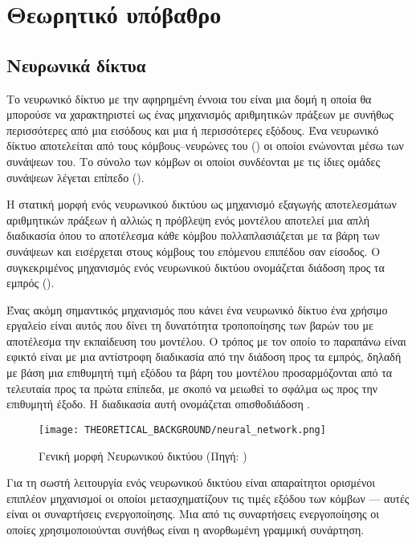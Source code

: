 \chapter{Θεωρητικό υπόβαθρο}
\label{ch:theoreteical_background}

\section{Νευρωνικά δίκτυα}
Το νευρωνικό δίκτυο με την αφηρημένη έννοια του είναι μια δομή η οποία θα μπορούσε να χαρακτηριστεί ως ένας μηχανισμός αριθμητικών πράξεων με συνήθως περισσότερες από μια εισόδους και μια ή περισσότερες εξόδους. Ένα νευρωνικό δίκτυο αποτελείται από τους κόμβους--νευρώνες του () οι οποίοι ενώνονται μέσω των συνάψεων του. Το σύνολο των κόμβων οι οποίοι συνδέονται με τις ίδιες ομάδες συνάψεων λέγεται επίπεδο ().

Η στατική μορφή ενός νευρωνικού δικτύου ως μηχανισμό εξαγωγής αποτελεσμάτων αριθμητικών πράξεων ή αλλιώς η πρόβλεψη ενός μοντέλου αποτελεί μια απλή διαδικασία όπου το αποτέλεσμα κάθε κόμβου πολλαπλασιάζεται με τα βάρη των συνάψεων και εισέρχεται στους κόμβους του επόμενου επιπέδου σαν είσοδος. Ο συγκεκριμένος μηχανισμός ενός νευρωνικού δικτύου ονομάζεται διάδοση προς τα εμπρός ().

Ένας ακόμη σημαντικός μηχανισμός που κάνει ένα νευρωνικό δίκτυο ένα χρήσιμο εργαλείο είναι αυτός που δίνει τη δυνατότητα τροποποίησης των βαρών του με αποτέλεσμα την εκπαίδευση του μοντέλου. Ο τρόπος με τον οποίο το παραπάνω είναι εφικτό είναι με μια αντίστροφη διαδικασία από την διάδοση προς τα εμπρός, δηλαδή με βάση μια επιθυμητή τιμή εξόδου τα βάρη του μοντέλου προσαρμόζονται από τα τελευταία προς τα πρώτα επίπεδα, με σκοπό να μειωθεί το σφάλμα ως προς την επιθυμητή έξοδο. Η διαδικασία αυτή ονομάζεται οπισθοδιάδοση .

\begin{figure}[H]
  \begin{center}
    \texttt{[image: THEORETICAL\_BACKGROUND/neural\_network.png]}
    \caption{Γενική μορφή Νευρωνικού δικτύου (Πηγή: \href{https://mc.ai/my-notes-on-neural-networks-2/}{})}
    \label{fig:neur_net}
  \end{center}
\end{figure}

Για τη σωστή λειτουργία ενός νευρωνικού δικτύου είναι απαραίτητοι ορισμένοι επιπλέον μηχανισμοί οι οποίοι μετασχηματίζουν τις τιμές εξόδου των κόμβων --- αυτές είναι οι συναρτήσεις ενεργοποίησης. Μια από τις συναρτήσεις ενεργοποίησης οι οποίες χρησιμοποιούνται συνήθως είναι η ανορθωμένη γραμμική συνάρτηση.

